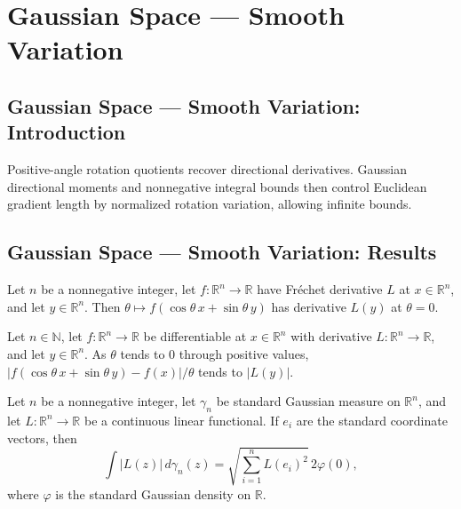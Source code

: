 \section{Gaussian Space --- Smooth Variation}
\subsection*{Gaussian Space --- Smooth Variation: Introduction}
Positive-angle rotation quotients recover directional derivatives. Gaussian directional moments and nonnegative integral bounds then control Euclidean gradient length by normalized rotation variation, allowing infinite bounds.

\subsection*{Gaussian Space --- Smooth Variation: Results}

\begin{lemma}
\leanok
{}
Let $n$ be a nonnegative integer, let $f:\mathbb R^n\to\mathbb R$ have Fréchet
derivative $L$ at $x\in\mathbb R^n$, and let $y\in\mathbb R^n$. Then $\theta\mapsto
f(\cos\theta\,x+\sin\theta\,y)$ has derivative $L(y)$ at $\theta=0$.
\end{lemma}

\begin{lemma}
\leanok
{}
Let $n\in\mathbb N$, let $f:\mathbb R^n\to\mathbb R$ be differentiable at $x\in\mathbb
R^n$ with derivative $L:\mathbb R^n\to\mathbb R$, and let $y\in\mathbb R^n$. As $\theta$
tends to $0$ through positive values, $|f(\cos\theta\,x+\sin\theta\,y)-f(x)|/\theta$
tends to $|L(y)|$.
\end{lemma}

\begin{lemma}
\leanok
{}
Let $n$ be a nonnegative integer, let $\gamma_n$ be standard Gaussian measure on
$\mathbb R^n$, and let $L:\mathbb R^n\to\mathbb R$ be a continuous linear functional. If
$e_i$ are the standard coordinate vectors, then
\[\int |L(z)|\,d\gamma_n(z)=\sqrt{\sum_{i=1}^n L(e_i)^2}\,2\varphi(0),\]
where $\varphi$ is the standard Gaussian density on $\mathbb R$.
\end{lemma}

